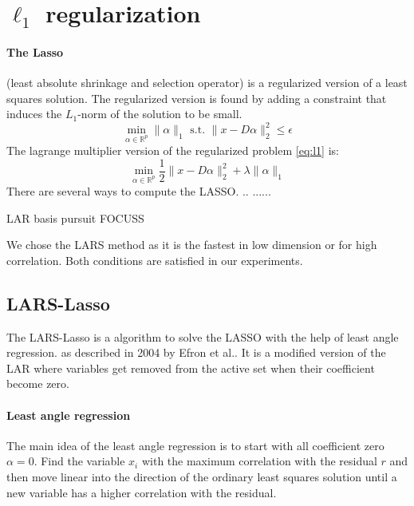 \section {$\ell_1$ regularization}



\paragraph{The Lasso} (least absolute shrinkage and selection operator) is a
regularized version of a least squares solution. The regularized version is
found by adding a constraint that induces the $L_1$-norm of the solution to be
small.\cite{Tibshirani1996}
\begin{equation}
\min_{\alpha\in\mathbb{R}^{p}}   \lVert \alpha \rVert_{1}   \textrm{ s.t. }
\lVert x - D\alpha \rVert^{2}_{2} \leq \epsilon\label{eq:l1}
\end{equation}
The lagrange multiplier version of the regularized problem \ref{eq:l1} is:
\begin{equation}
\min_{\alpha\in\mathbb{R}^{p}}  \frac{1}{2} \lVert x - D\alpha \rVert^{2}_{2} +
\lambda \lVert \alpha \rVert_{1}
\end{equation}
There are several ways to compute the LASSO. .. ...... 

LAR\cite{Efron2004} basis pursuit\cite{Chen1995}  FOCUSS\cite{FOCUSS}

We chose the LARS method as it is the fastest in low dimension or for
high correlation. Both conditions are satisfied in our experiments. 


\subsection {LARS-Lasso}
\label{sec:lars}
The LARS-Lasso is a algorithm to solve the LASSO with the help of least
angle regression. as described in 2004 by Efron et al.\cite{Efron2004}. It
is a modified version of
the LAR where variables get removed from the active set when their coefficient
become zero.

\paragraph{Least angle regression}
The main idea of the least angle regression is to start with all coefficient
zero
$\alpha = 0$. Find the variable $x_i$ with the maximum correlation with the
residual $r$ and then move linear into the direction of the ordinary least
squares solution until a new variable has a higher correlation with the
residual. 



